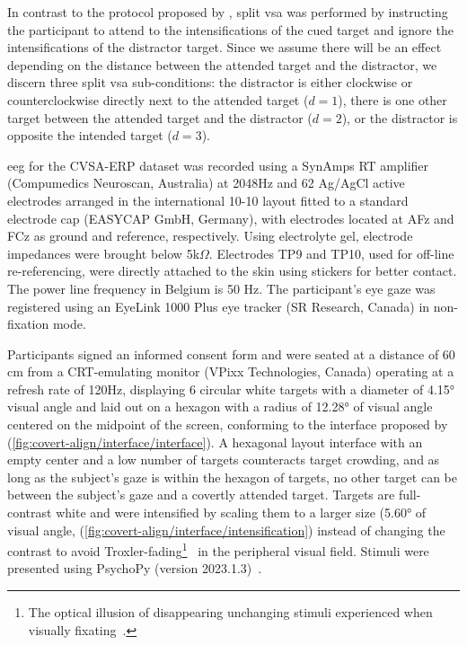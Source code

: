 In contrast to the protocol proposed by \cite{Frenzel2011}, split \ac{vsa} was
performed by instructing the participant to attend to the intensifications of the
cued target and ignore the intensifications of the distractor target.
Since we assume there will be an effect depending on the distance between
the attended target and the distractor, we discern three split \ac{vsa} sub-conditions:
the distractor is either clockwise or counterclockwise directly next to the
attended target ($d=1$), there is one other target between the attended target and
the distractor ($d=2$), or the distractor is opposite the intended target
($d=3$).

\ac{eeg} for the CVSA-ERP dataset was recorded using a SynAmps RT amplifier
(Compumedics Neuroscan, Australia) at 2048Hz and 62 Ag/AgCl active electrodes arranged in the
international 10-10 layout fitted to a standard electrode cap (EASYCAP GmbH,
Germany), with electrodes located at AFz and FCz as ground and reference, respectively.
Using electrolyte gel, electrode impedances were brought below 5k$\Omega$.
Electrodes TP9 and TP10, used for off-line re-referencing, were directly
attached to the skin using stickers for better contact.
The power line frequency in Belgium is 50 Hz.
The participant's eye gaze was registered using an EyeLink 1000 Plus eye tracker (SR Research,
Canada) in non-fixation mode.

Participants signed an informed consent form and were seated at a distance of
60 cm from a CRT-emulating monitor (VPixx
Technologies, Canada) operating at a refresh rate of 120Hz, displaying 6
circular white targets with a diameter of 4.15° visual angle and laid out on a hexagon
with a radius of 12.28° of visual angle centered on the midpoint of the screen,
conforming to the interface proposed by \textcite{Treder2010}
(\cref{fig:covert-align/interface/interface}).
A hexagonal layout interface with an empty center and a low number of targets
counteracts target crowding, and as long as the subject’s gaze is within the hexagon of
targets, no other target can be between the subject’s gaze and a covertly
attended target.
Targets are full-contrast white and were intensified by scaling them to a
larger size (5.60° of visual angle,
(\cref{fig:covert-align/interface/intensification}) instead of changing the contrast to avoid Troxler-fading\footnote{The optical illusion of disappearing unchanging stimuli
experienced when visually fixating~\cite{Troxler1804}.}~\cite{Treder2010} in the
peripheral visual field.
Stimuli were presented using PsychoPy (version 2023.1.3)~\cite{Peirce2019}.

